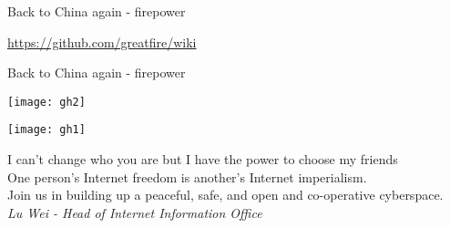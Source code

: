 \documentclass[xcolor=table]{beamer}
\begin{document}
\begin{frame}{Back to China again - firepower}
\centerline{\url{https://github.com/greatfire/wiki}}
\end{frame}

\begin{frame}{Back to China again - firepower}
\centerline{\texttt{[image: gh2]}}
\centerline{\texttt{[image: gh1]}}	
\end{frame}

\begin{frame}{}
\Large{I can’t change who you are but I have the power to choose my friends} \\
\vspace{0.5em}
\Large{One person’s Internet freedom is another’s Internet imperialism.} \\
\vspace{0.5em}
\Large{Join us in building up a peaceful, safe, and open and co-operative cyberspace.} \\
\vspace{0.5em}
\small{\textit{Lu Wei - Head of Internet Information Office}}
\end{frame}

\end{document}
